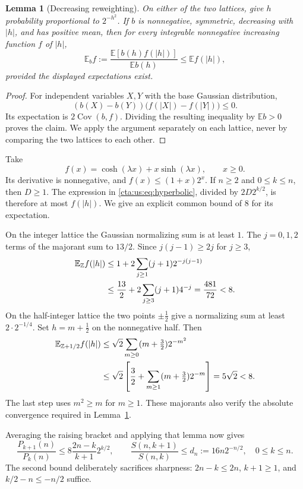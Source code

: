 \documentclass[11pt]{article}
\newtheorem{lemma}[theorem]{Lemma}
\theoremstyle{definition}
\theoremstyle{remark}
\newcommand{\E}{\mathbb E}
\newcommand{\Z}{\mathbb Z}
\newcommand{\la}{\lambda}
\begin{document}
\begin{lemma}[Decreasing reweighting]\label{cta:us:lem:reweight}
On either of the two lattices, give $h$ probability proportional to
$2^{-h^2}$. If $b$ is nonnegative, symmetric, decreasing with $|h|$,
and has positive mean, then for every integrable nonnegative increasing
function $f$ of $|h|$,
\begin{equation}\label{cta:us:eq:reweight}
 \E_b f:=\frac{\E[b(h)f(|h|)]}{\E b(h)}\le\E f(|h|),
\end{equation}
provided the displayed expectations exist.
\end{lemma}
\begin{proof}
For independent variables $X,Y$ with the base Gaussian distribution,
\[
 (b(X)-b(Y))\bigl(f(|X|)-f(|Y|)\bigr)\le0.
\]
Its expectation is $2\operatorname{Cov}(b,f)$. Dividing the resulting
inequality by $\E b>0$ proves the claim. We apply the argument separately
on each lattice, never by comparing the two lattices to each other.
\end{proof}

Take
\[
 f(x)=\cosh(\la x)+x\sinh(\la x),\qquad x\ge0.
\]
Its derivative is nonnegative, and $f(x)\le(1+x)2^x$. If $n\ge2$ and
$0\le k\le n$, then $D\ge1$. The expression in
\eqref{cta:us:eq:hyperbolic}, divided by $2D2^{k/2}$, is therefore at most
$f(|h|)$. We give an explicit common bound of $8$ for its expectation.

On the integer lattice the Gaussian normalizing sum is at least $1$.
The $j=0,1,2$ terms of the majorant sum to $13/2$. Since
$j(j-1)\ge2j$ for $j\ge3$,
\begin{align}\label{cta:us:eq:integer-eight}
 \E_{\Z}f(|h|)
 &\le1+2\sum_{j\ge1}(j+1)2^{-j(j-1)}\notag\\
 &\le\frac{13}{2}+2\sum_{j\ge3}(j+1)4^{-j}
  =\frac{481}{72}<8.
\end{align}
On the half-integer lattice the two points $\pm\tfrac12$ give a
normalizing sum at least $2\cdot2^{-1/4}$. Set $h=m+\tfrac12$ on
the nonnegative half. Then
\begin{align}\label{cta:us:eq:half-eight}
 \E_{\Z+1/2}f(|h|)
 &\le\sqrt2\sum_{m\ge0}(m+\tfrac32)2^{-m^2}\notag\\
 &\le\sqrt2\left[\frac32+
          \sum_{m\ge1}(m+\tfrac32)2^{-m}\right]
   =5\sqrt2<8.
\end{align}
The last step uses $m^2\ge m$ for $m\ge1$. These majorants also verify
the absolute convergence required in Lemma~\ref{cta:us:lem:reweight}.

Averaging the raising bracket and applying that lemma now gives
\begin{equation}\label{cta:us:eq:low-ratio}
 \frac{P_{k+1}(n)}{P_k(n)}
 \le8\frac{2n-k}{k+1}2^{k/2},\qquad
 \frac{S(n,k+1)}{S(n,k)}\le d_n:=16n2^{-n/2},
 \quad 0\le k\le n.
\end{equation}
The second bound deliberately sacrifices sharpness: $2n-k\le2n$,
$k+1\ge1$, and $k/2-n\le-n/2$ suffice.
\end{document}
